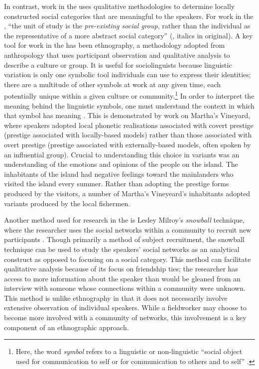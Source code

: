 In contrast, work in the  uses qualitative methodologies to determine locally constructed social categories that are meaningful to the speakers. For work in the ,	``the unit of study is the \textit{pre-existing social group}, rather than the individual as the representative of a more abstract social category'' (\cite[35]{milroy1987}, italics in original). A key tool for work in the  has been ethnography, a methodology adopted from anthropology that uses participant observation and qualitative analysis to describe a culture or group. It is useful for sociolinguists because linguistic variation is only one symbolic tool individuals can use to express their identities; there are a multitude of other symbols at work at any given time, each potentially unique within a given culture or community.\footnote{Here, the word \textit{symbol} refers to a linguistic or non-linguistic ``social object used for communication to self or for communication to others and to self'' \citep[42]{charon1995}.} In order to interpret the meaning behind the linguistic symbols, one must understand the context in which that symbol has meaning \citep[22]{savilletroike1982}. This is demonstrated by  work on Martha's Vineyard, where speakers adopted local phonetic realisations associated with covert prestige (prestige associated with locally-based models) rather than those associated with overt prestige (prestige associated with externally-based models, often spoken by an influential group). Crucial to understanding this choice in variants was an understanding of the emotions and opinions of the people on the island. The inhabitants of the island had negative feelings toward the mainlanders who visited the island every summer. Rather than adopting the prestige forms produced by the visitors, a number of Martha's Vineyeard's inhabitants adopted variants produced by the local fishermen. 

Another method used for research in the  is Lesley Milroy's \textit{snowball} technique, where the researcher uses the social networks within a community to recruit new participants \citep[32]{milroygordon2003}. Though primarily a method of subject recruitment, the snowball technique can be used to study the speakers' social networks as an analytical construct as opposed to focusing on a social category. This method can facilitate qualitative analysis because of its focus on friendship ties; the researcher has access to more information about the speaker than would be gleaned from an interview with someone whose connections within a community were unknown. This method is unlike ethnography in that it does not necessarily involve extensive observation of individual speakers. While a fieldworker may choose to become more involved with a community of networks, this involvement is a key component of an ethnographic approach. 

